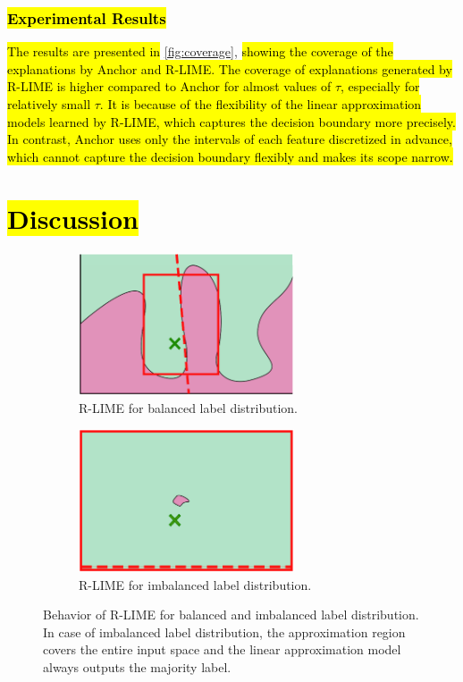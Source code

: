 \documentclass[runningheads]{llncs}
\begin{document}
{\subsubsection{\hl{Experimental Results}}
\hl{The results are presented in} \cref{fig:coverage},
\hl{
  showing the coverage of the explanations by Anchor and R-LIME\@.
  The coverage of explanations generated by R-LIME is higher compared to Anchor
  for almost values of $\tau$, especially for relatively small $\tau$.
  It is because of the flexibility of the linear approximation models learned by
  R-LIME, which captures the decision boundary more precisely.
  In contrast,
  Anchor uses only the intervals of each feature discretized in advance,
  which cannot capture the decision boundary flexibly and makes its scope narrow.
}


\section{\hl{Discussion}}
 {%
  \def\imgwidth{0.47\textwidth}
  \begin{figure}[t]
    \centering
    \begin{subfigure}[t]{\imgwidth}
      \centering
      \includegraphics[width=0.7\textwidth]{visual-rlime3}
      \caption{R-LIME for balanced label distribution.}
    \end{subfigure}
    \begin{subfigure}[t]{\imgwidth}
      \centering
      \includegraphics[width=0.7\textwidth]{visual-rlime-imbalanced}
      \caption{R-LIME for imbalanced label distribution.
      }
    \end{subfigure}
    \caption[Behavior of R-LIME for balanced and imbalanced label distribution]{%
      Behavior of R-LIME for balanced and imbalanced label distribution.
      In case of imbalanced label distribution,
      the approximation region covers the entire input space and the
      linear approximation model always outputs the majority label.
    }\label{fig:imbalanced}
  \end{figure}
 }

}
\end{document}
